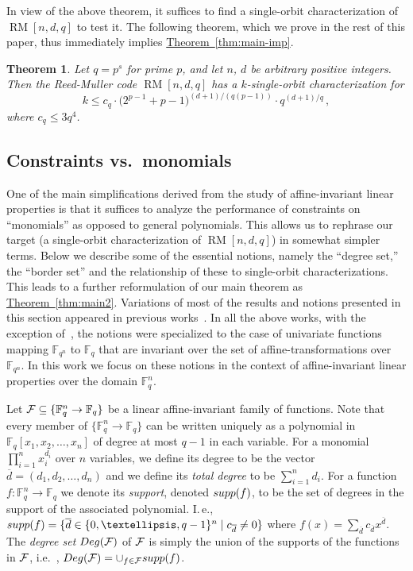 \documentclass[10pt]{article}
\newtheorem{theorem}{Theorem}[section]
\theoremstyle{definition}
\providecommand{\ie}{i.e.\ }
\numberwithin{equation}{section}
\newcommand{\expref}[2]{\texorpdfstring{\hyperref[#2]{#1~\ref{#2}}}{#1~\ref{#2}}}
\newcommand{\calf}{{\cal F}}
\newcommand{\F}{{\mathbb{F}}}
\newcommand{\cF}{{\mathcal{F}}}
\newcommand{\Deg}{{\rm{Deg}}}
\newcommand{\supp}{{\rm{supp}}}
\newcommand{\mrm}{\mathop{\mathrm{RM}}}
\begin{document}
In view of the above theorem, it suffices to find a single-orbit
characterization of $\mrm[n,d,q]$ to test it. The following theorem,
which we prove in the rest of this paper, thus immediately implies
\expref{Theorem}{thm:main-imp}.

\begin{theorem}\label{thm:main}
Let $q = p^s$ for prime $p$, and let $n$, $d$ be arbitrary positive
integers.
Then the Reed-Muller code $\mrm[n,d,q]$ has a $k$-single-orbit characterization for
 \[k \leq c_q \cdot  \big(2^{p-1}+p-1\big)^{(d+1)/(q(p-1))} \cdot q^{(d+1)/q}\,,\]
where $c_q \leq 3q^4$.
\end{theorem}

\subsection{Constraints vs.\ monomials}

One of the main simplifications derived from the study
of affine-invariant linear properties is that it suffices to
analyze the performance of constraints on ``monomials''
as opposed to general polynomials.
This allows us to rephrase our target (a single-orbit
characterization of $\mrm[n,d,q]$) in somewhat simpler
terms. Below we describe some of the essential notions,
namely the ``degree set,'' the ``border set'' and the
relationship of these to single-orbit characterizations.
This leads to a further reformulation of our main theorem
as \expref{Theorem}{thm:main2}.
Variations of most of the results and notions presented in this
section appeared in previous works~\cite{KS08,GKS09,BS11,BGMSS11}.
In all the above works, with the exception of~\cite{KS08},
the notions were specialized to the case of univariate functions
mapping $\F_{q^n}$ to $\F_q$
that are invariant over the set of affine-transformations over $\F_{q^n}$.
In this work we focus on these notions in the context of
affine-invariant linear properties over the domain $\F_q^n$.

Let $\calf \subseteq \{\F_{q}^n \to \F_q\}$ be a linear affine-invariant family of
functions. Note that every member of $\{\F_{q}^n \to \F_q\}$ can be written uniquely as
a polynomial in $\F_q[x_1,x_2,\ldots,x_n]$ of degree at most $q-1$ in each variable.
For a monomial  $\prod_{i=1}^nx_i^{d_i}$ over $n$ variables,  we define its degree to be the vector $\overline d = (d_1,d_2, \ldots, d_n)$ and we define its \emph{total degree} to be $\sum_{i=1}^n d_i$.
For a function
$f:\F_{q}^n \to \F_q$ we denote its \emph{support}, denoted $\supp(f)$, to
be the set of degrees in the support of the associated polynomial. I.\,e.,
$\supp(f) = \{ \overline d \in \{0,\ldots,q-1\}^n\;|\;c_{\overline d} \ne 0\}$ where $f(x) = \sum_{\overline d} c_{\overline d} x^{\overline d}$.
The \emph{degree set} $\Deg(\cF)$ of $\calf$ is simply the union of the supports of the functions
in $\calf$, \ie, $\Deg(\calf) = \cup_{f \in \calf} \supp(f)$.
\end{document}
